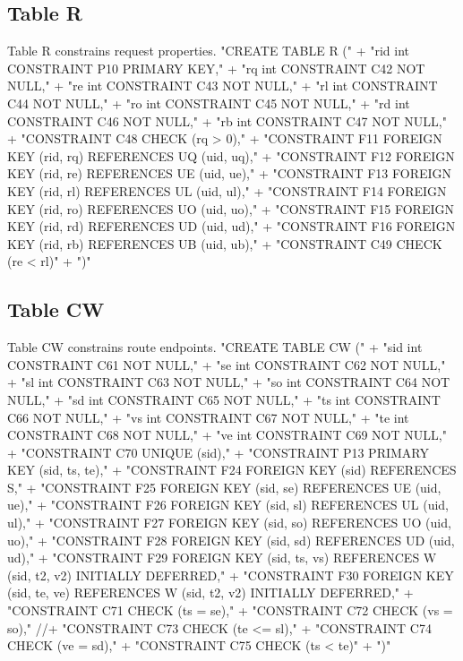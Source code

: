 \subsection{Table R}
Table R constrains request properties.
\nwenddocs{}\endmoddef{}
"CREATE TABLE R ("
  + "rid int  CONSTRAINT P10 PRIMARY KEY,"
  + "rq  int  CONSTRAINT C42 NOT NULL,"
  + "re  int  CONSTRAINT C43 NOT NULL,"
  + "rl  int  CONSTRAINT C44 NOT NULL,"
  + "ro  int  CONSTRAINT C45 NOT NULL,"
  + "rd  int  CONSTRAINT C46 NOT NULL,"
  + "rb  int  CONSTRAINT C47 NOT NULL,"
  + "CONSTRAINT C48 CHECK (rq > 0),"
  + "CONSTRAINT F11 FOREIGN KEY (rid, rq) REFERENCES UQ (uid, uq),"
  + "CONSTRAINT F12 FOREIGN KEY (rid, re) REFERENCES UE (uid, ue),"
  + "CONSTRAINT F13 FOREIGN KEY (rid, rl) REFERENCES UL (uid, ul),"
  + "CONSTRAINT F14 FOREIGN KEY (rid, ro) REFERENCES UO (uid, uo),"
  + "CONSTRAINT F15 FOREIGN KEY (rid, rd) REFERENCES UD (uid, ud),"
  + "CONSTRAINT F16 FOREIGN KEY (rid, rb) REFERENCES UB (uid, ub),"
  + "CONSTRAINT C49 CHECK (re < rl)"
  + ")"
\nwendcode{}\nwdocspar

\subsection{Table CW}
Table CW constrains route endpoints.
\nwenddocs{}\endmoddef{}
"CREATE TABLE CW ("
  + "sid int  CONSTRAINT C61 NOT NULL,"
  + "se  int  CONSTRAINT C62 NOT NULL,"
  + "sl  int  CONSTRAINT C63 NOT NULL,"
  + "so  int  CONSTRAINT C64 NOT NULL,"
  + "sd  int  CONSTRAINT C65 NOT NULL,"
  + "ts  int  CONSTRAINT C66 NOT NULL,"
  + "vs  int  CONSTRAINT C67 NOT NULL,"
  + "te  int  CONSTRAINT C68 NOT NULL,"
  + "ve  int  CONSTRAINT C69 NOT NULL,"
  + "CONSTRAINT C70 UNIQUE (sid),"
  + "CONSTRAINT P13 PRIMARY KEY (sid, ts, te),"
  + "CONSTRAINT F24 FOREIGN KEY (sid) REFERENCES S,"
  + "CONSTRAINT F25 FOREIGN KEY (sid, se) REFERENCES UE (uid, ue),"
  + "CONSTRAINT F26 FOREIGN KEY (sid, sl) REFERENCES UL (uid, ul),"
  + "CONSTRAINT F27 FOREIGN KEY (sid, so) REFERENCES UO (uid, uo),"
  + "CONSTRAINT F28 FOREIGN KEY (sid, sd) REFERENCES UD (uid, ud),"
  + "CONSTRAINT F29 FOREIGN KEY (sid, ts, vs) REFERENCES W (sid, t2, v2) INITIALLY DEFERRED,"
  + "CONSTRAINT F30 FOREIGN KEY (sid, te, ve) REFERENCES W (sid, t2, v2) INITIALLY DEFERRED,"
  + "CONSTRAINT C71 CHECK (ts = se),"
  + "CONSTRAINT C72 CHECK (vs = so),"
//+ "CONSTRAINT C73 CHECK (te <= sl),"
  + "CONSTRAINT C74 CHECK (ve = sd),"
  + "CONSTRAINT C75 CHECK (ts < te)"
  + ")"
\nwendcode{}\nwdocspar

